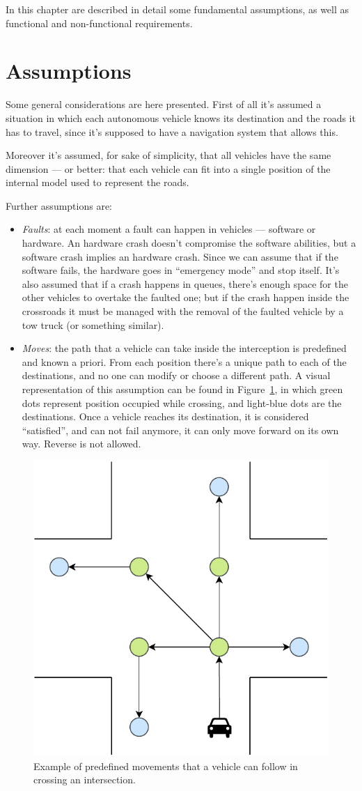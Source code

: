 \documentclass{memoir}
\begin{document}
In this chapter are described in detail some fundamental assumptions, as well as functional and non-functional requirements.

\section{Assumptions}
Some general considerations are here presented. First of all it's assumed a situation in which each autonomous vehicle knows its destination and the roads it has to travel, since it's supposed to have a navigation system that allows this.

Moreover it's assumed, for sake of simplicity, that all vehicles have the same dimension --- or better: that each vehicle can fit into a single position of the internal model used to represent the roads.

Further assumptions are:

\begin{itemize}
	\item \emph{Faults}: at each moment a fault can happen in vehicles --- software or hardware. An hardware crash doesn't compromise the software abilities, but a software crash implies an hardware crash. Since we can assume that if the software fails, the hardware goes in ``emergency mode'' and stop itself. It's also assumed that if a crash happens in queues, there's enough space for the other vehicles to overtake the faulted one; but if the crash happen inside the crossroads it must be managed with the removal of the faulted vehicle by a tow truck (or something similar).
	\item \emph{Moves}: the path that a vehicle can take inside the interception is predefined and known a priori. From each position there's a unique path to each of the destinations, and no one can modify or choose a different path. A visual representation of this assumption can be found in Figure~\ref{fig:intersection-graph}, in which green dots represent position occupied while crossing, and light-blue dots are the destinations. Once a vehicle reaches its destination, it is considered ``satisfied'', and can not fail anymore, it can only move forward on its own way. Reverse is not allowed.
\end{itemize}

\begin{figure}
	\centering
	\includegraphics[width=0.4\linewidth]{intersection_graph.pdf}
	\caption{Example of predefined movements that a vehicle can follow in crossing an intersection.}
	\label{fig:intersection-graph}
\end{figure}
\end{document}
